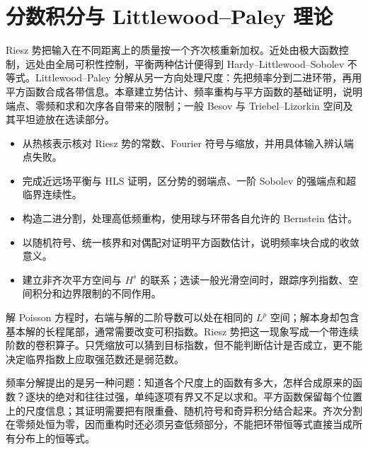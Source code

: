 \chapter{分数积分与 Littlewood–Paley 理论}
\label{b2:ch:19}
\begin{chapterabstract}
Riesz 势把输入在不同距离上的质量按一个齐次核重新加权。近处由极大函数控制，远处由全局可积性控制，平衡两种估计便得到 Hardy--Littlewood--Sobolev 不等式。Littlewood--Paley 分解从另一方向处理尺度：先把频率分到二进环带，再用平方函数合成各带信息。本章建立势估计、频率重构与平方函数的基础证明，说明端点、零频和求和次序各自带来的限制；一般 Besov 与 Triebel--Lizorkin 空间及其平坦迹放在选读部分。
\end{chapterabstract}

\begin{learninggoals}\begin{itemize}
\item\label{b2:item:19-goal-1}从热核表示核对 Riesz 势的常数、Fourier 符号与缩放，并用具体输入辨认端点失败。
\item\label{b2:item:19-goal-2}完成近远场平衡与 HLS 证明，区分势的弱端点、一阶 Sobolev 的强端点和超临界连续性。
\item\label{b2:item:19-goal-3}构造二进分割，处理高低频重构，使用球与环带各自允许的 Bernstein 估计。
\item\label{b2:item:19-goal-4}以随机符号、统一核界和对偶配对证明平方函数估计，说明频率块合成的收敛意义。
\item\label{b2:item:19-goal-5}建立非齐次平方空间与 \(H^s\) 的联系；选读一般光滑空间时，跟踪序列指数、空间积分和边界限制的不同作用。
\end{itemize}\end{learninggoals}

解 Poisson 方程时，右端与解的二阶导数可以处在相同的 \(L^p\) 空间；解本身却包含基本解的长程尾部，通常需要改变可积指数。Riesz 势把这一现象写成一个带连续阶数的卷积算子。只凭缩放可以猜到目标指数，但不能判断估计是否成立，更不能决定临界指数上应取强范数还是弱范数。

\ProseParagraphBreak

频率分解提出的是另一种问题：知道各个尺度上的函数有多大，怎样合成原来的函数？逐块的绝对和往往过强，单纯逐项有界又不足以求和。平方函数保留每个位置上的尺度信息；其证明需要把有限重叠、随机符号和奇异积分结合起来。齐次分割在零频处恒为零，因而重构时还必须另查低频部分，不能把环带恒等式直接当成所有分布上的恒等式。

\ProseParagraphBreak

